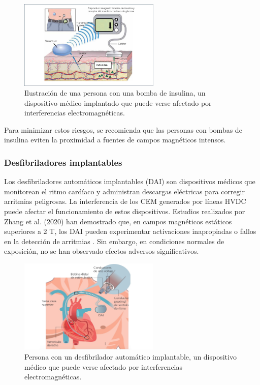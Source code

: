 \begin{figure}
    \centering
    \includegraphics[width=0.6\textwidth]{img/ejemplos/Figure_6}
    \caption{Ilustración de una persona con una bomba de insulina, un dispositivo médico implantado que puede verse afectado por interferencias electromagnéticas.}
    \label{fig:figure_6}
\end{figure}
Para minimizar estos riesgos, se recomienda que las personas con bombas de insulina eviten la proximidad a fuentes de campos magnéticos intensos.

\subsubsection{Desfibriladores implantables}

Los desfibriladores automáticos implantables (DAI) son dispositivos médicos que monitorean el ritmo cardíaco y administran descargas eléctricas para corregir arritmias peligrosas. La interferencia de los CEM generados por líneas HVDC puede afectar el funcionamiento de estos dispositivos. Estudios realizados por Zhang et al. (2020) han demostrado que, en campos magnéticos estáticos superiores a 2 T, los DAI pueden experimentar activaciones inapropiadas o fallos en la detección de arritmias \cite{Zhang2020Defibrillators}. Sin embargo, en condiciones normales de exposición, no se han observado efectos adversos significativos.

\begin{figure}
    \centering
    \includegraphics[width=0.6\textwidth]{img/ejemplos/Figure_7}
    \caption{Persona con un desfibrilador automático implantable, un dispositivo médico que puede verse afectado por interferencias electromagnéticas.}
    \label{fig:figure_7}
\end{figure}

